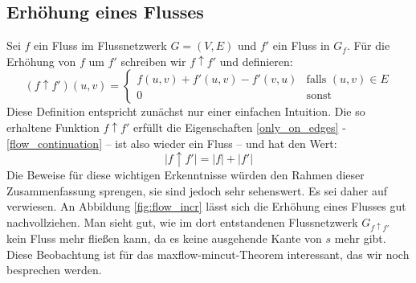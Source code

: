 \documentclass[12pt,a4paper,titlepage,onecolumn,ngerman,bibliography=totocnumbered]{scrartcl}
\theoremstyle{definition}
\theoremstyle{remark}
\begin{document}
\subsection{Erhöhung eines Flusses}
Sei $f$ ein Fluss im Flussnetzwerk $G = (V,E)$ und $f'$ ein Fluss in $G_f$.
Für die Erhöhung von $f$ um $f'$ schreiben wir $f \uparrow f'$ und definieren:
\begin{equation}
	(f \uparrow f')(u,v)=
	\begin{cases}
		f(u,v) + f'(u,v) - f'(v,u) & \text{falls $(u,v) \in E$} \\
		0                          & \text{sonst}
	\end{cases}
\end{equation}
Diese Definition entspricht zunächst nur einer einfachen Intuition.
\medbreak
Die so erhaltene Funktion $f\uparrow f'$ erfüllt die Eigenschaften \eqref{only_on_edges} - \eqref{flow_continuation} -- ist also wieder ein Fluss -- und hat den Wert:
\begin{equation}\label{flow_incr}
	\lvert f\uparrow f' \rvert = \lvert f \rvert + \lvert f'\rvert
\end{equation}
Die Beweise für diese wichtigen Erkenntnisse würden den Rahmen dieser Zusammenfassung sprengen, sie sind jedoch sehr sehenswert.
Es sei daher auf \cite[][S. 730-732]{Cormen09} verwiesen.
An Abbildung \ref{fig:flow_incr} lässt sich die Erhöhung eines Flusses gut nachvollziehen.
Man sieht gut, wie im dort entstandenen Flussnetzwerk $G_{f\uparrow f'}$ kein Fluss mehr fließen kann, da es keine ausgehende Kante von $s$ mehr gibt.
Diese Beobachtung ist für das maxflow-mincut-Theorem interessant, das wir noch besprechen werden.
\end{document}
